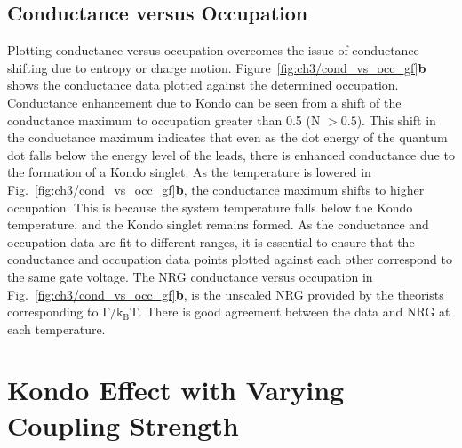 \subsection{Conductance versus Occupation}

Plotting conductance versus occupation overcomes the issue of conductance shifting due to entropy or charge motion. Figure~\ref{fig:ch3/cond_vs_occ_gf}\textbf{b} shows the conductance data plotted against the determined occupation. Conductance enhancement due to Kondo can be seen from a shift of the conductance maximum to occupation greater than 0.5 (N $>0.5$). This shift in the conductance maximum indicates that even as the dot energy of the quantum dot falls below the energy level of the leads, there is enhanced conductance due to the formation of a Kondo singlet. As the temperature is lowered in Fig.~\ref{fig:ch3/cond_vs_occ_gf}\textbf{b}, the conductance maximum shifts to higher occupation. This is because the system temperature falls below the Kondo temperature, and the Kondo singlet remains formed. As the conductance and occupation data are fit to different ranges, it is essential to ensure that the conductance and occupation data points plotted against each other correspond to the same gate voltage. The NRG conductance versus occupation in Fig.~\ref{fig:ch3/cond_vs_occ_gf}\textbf{b}, is the unscaled NRG provided by the theorists corresponding to $\mathrm{\Gamma/k_BT}$. There is good agreement between the data and NRG at each temperature. 



\section{Kondo Effect with Varying Coupling Strength}


